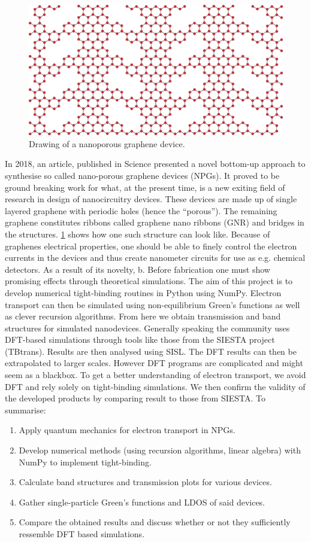 \begin{figure}
	\vspace{-1em}
	\centering
	\includegraphics[width=.4\textwidth]{Figures/NPGintroGraphic.eps}
	\caption{Drawing of a nanoporous graphene device.}\label{introGraphic}
\end{figure}
In 2018, an article\cite{Moreno199}, published in Science presented a novel bottom-up approach to synthesise so called nano-porous graphene devices (NPGs). It proved to be ground breaking work for what, at the present time, is a new exiting field of research in design of nanocircuitry devices. These devices are made up of single layered graphene with periodic holes (hence the ``porous''). The remaining graphene constitutes ribbons called graphene nano ribbons (GNR) and bridges in the structures. \cref{introGraphic} shows how one such structure can look like.
Because of graphenes electrical properties\cite{calogero_electron_2019}, one should be able to finely control the electron currents in the devices and thus create nanometer circuits for use as e.g. chemical detectors. As a result of its novelty, b. Before fabrication one must show promising effects through theoretical simulations.\newline
The aim of this project is to develop numerical tight-binding routines in Python using NumPy. Electron transport can then be simulated using non-equilibrium Green's functions as well as clever recursion algorithms. From here we obtain transmission and band structures for simulated nanodevices.\newline
Generally speaking the community uses DFT-based simulations through tools like those from the SIESTA project (TBtrans). Results are then analysed using SISL\cite{zerothi_sisl}. The DFT results can then be extrapolated to larger scales\cite{calogero_electron_2019}. However DFT programs are complicated and might seem as a blackbox. To get a better understanding of electron transport, we avoid DFT and rely solely on tight-binding simulations. We then confirm the validity of the developed products by comparing result to those from SIESTA.\newline
To summarise:
\begin{enumerate}
	\item Apply quantum mechanics for electron transport in NPGs.
	\item Develop numerical methods (using recursion algorithms, linear algebra) with NumPy to implement tight-binding.
	\item Calculate band structures and transmission plots for various devices.
	\item Gather single-particle Green’s functions and LDOS of said devices.
	\item Compare the obtained results and discuss whether or not they sufficiently ressemble DFT based simulations.
\end{enumerate}
